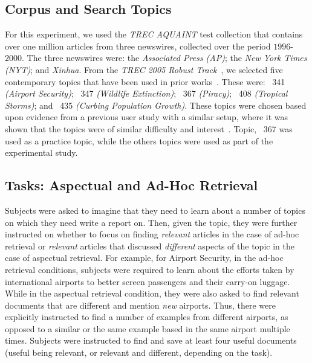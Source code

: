 

\subsection{Corpus and Search Topics}\label{sec:method:corpus}
For this experiment, we used the \emph{TREC AQUAINT} test collection that contains over one million articles from three newswires, collected over the period $1996$-$2000$. The three newswires were: the \emph{Associated Press (AP)}; the \emph{New York Times (NYT)}; and \emph{Xinhua}.  From the \emph{TREC 2005 Robust Track}~\cite{voorhees2006trec_robust}, we selected five contemporary topics that have been used in prior works~\cite{kelly2009query_suggestion, azzopardi2013query_cost, maxwell2017snippet_length}. These were: \textnumero~341 \emph{(Airport Security)}; \textnumero~347 \emph{(Wildlife Extinction)}; \textnumero~367 \emph{(Piracy)}; \textnumero~408 \emph{(Tropical Storms)}; and \textnumero~435 \emph{(Curbing Population Growth)}. These topics were chosen based upon evidence from a previous user study with a similar setup, where it was shown that the topics were of similar difficulty and interest~\cite{kelly2009query_suggestion}. Topic, \textnumero~367 was used as a practice topic, while the others topics were used as part of the experimental study.

\subsection{Tasks: Aspectual and Ad-Hoc Retrieval}
Subjects were asked to imagine that they need to learn about a number of topics on which they need write a report on. Then, given the topic, they were further instructed on whether to focus on finding \emph{relevant} articles in the case of ad-hoc retrieval or \emph{relevant} articles that discussed \emph{different} aspects of the topic in the case of aspectual retrieval.  For example, for Airport Security, in the ad-hoc retrieval conditions, subjects were required to learn about the efforts taken by international airports to better screen passengers and their carry-on luggage. While in the aspectual retrieval condition, they were also asked to find relevant documents that are different and mention \emph{new} airports. Thus, there were explicitly instructed to find a number of examples from different airports, as opposed to a similar or the same example based in the same airport multiple times. Subjects were instructed to find and save at least four useful documents (useful being relevant, or relevant and different, depending on the task). 

